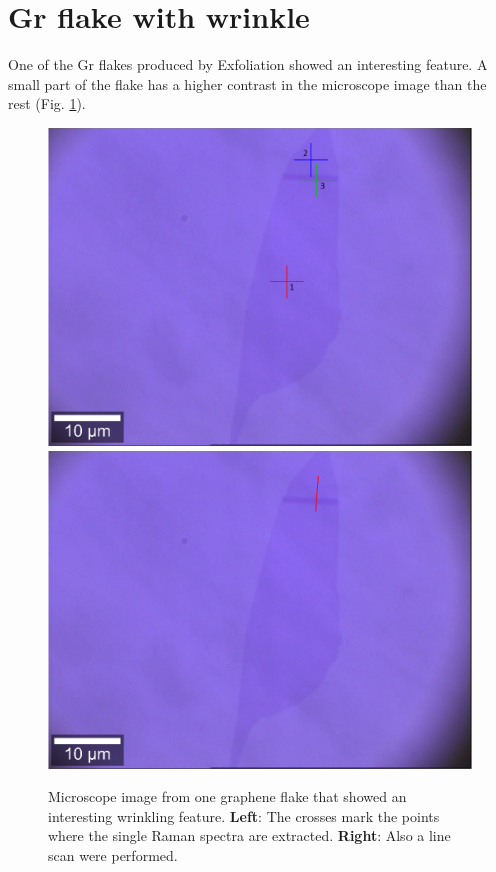 \documentclass[12pt,a4paper]{article}
\begin{document}
\section{Gr flake with wrinkle}
\label{sec:4}
One of the Gr flakes produced by Exfoliation showed an interesting feature. A small part of the flake has a higher contrast in the microscope image than the rest (Fig. \ref{fig:wrinkle_microscope}).

\begin{figure}[h]
\centering
\includegraphics[scale=0.3]{Bilder/Wrinkle/mono_single_spectra.PNG}
\includegraphics[scale=0.22]{Bilder/Wrinkle/mono_line_scan.PNG}
\caption{Microscope image from one graphene flake that showed an interesting wrinkling feature. \textbf{Left}: The crosses mark the points where the single Raman spectra are extracted. \textbf{Right}: Also a line scan were performed.}
\label{fig:wrinkle_microscope}
\end{figure}
\end{document}
